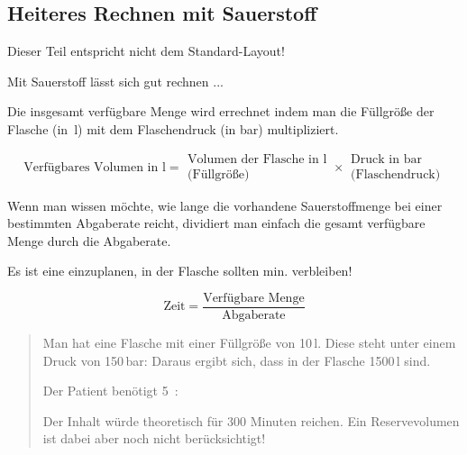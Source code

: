 \subsection{Heiteres Rechnen mit Sauerstoff}
{}
{Dieser Teil entspricht nicht dem Standard-Layout!}

Mit Sauerstoff lässt sich gut rechnen ...

Die insgesamt verfügbare Menge wird errechnet indem man
die Füllgröße der Flasche (in~l) mit dem
Flaschendruck (in bar) multipliziert.

\begin{equation}
\mbox{Verfügbares Volumen in l} = {\begin{array}{c}
\mbox{Volumen der Flasche in l}\\
\mbox{(Füllgröße)} \end{array}}
\times 
\begin{array}{c}{\mbox{Druck in bar}}\\
\mbox{(Flaschendruck)}
\end{array}
\end{equation}




Wenn man wissen möchte, wie lange die vorhandene Sauerstoffmenge bei
einer bestimmten Abgaberate reicht, dividiert man einfach
die gesamt verfügbare Menge durch die Abgaberate. 

 Es ist eine 
einzuplanen, in der Flasche sollten min.  verbleiben! 


\begin{equation}
\mbox{Zeit} = \frac{\mbox{Verfügbare
Menge}}{\mbox{Abgaberate}}
\end{equation}





\begin{quote}
Man hat eine Flasche mit einer Füllgröße von 10\,l. Diese
steht unter einem Druck von 150\,bar: Daraus ergibt
sich, dass in der Flasche 1500\,l  sind.

Der Patient benötigt 5\,  : 

Der Inhalt würde theoretisch für 300 Minuten reichen. Ein
Reservevolumen ist dabei aber noch nicht berücksichtigt!
\end{quote}




